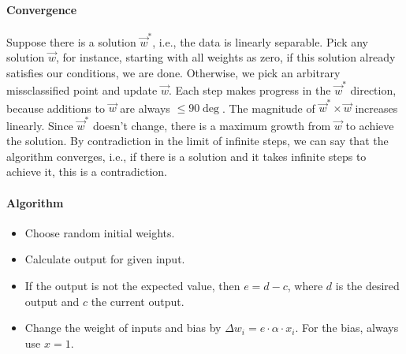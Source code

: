 \documentclass[main]{subfiles}
\begin{document}
\paragraph{Convergence}
Suppose there is a solution $\vec{w}^*$, i.e., the data is linearly separable.
Pick any solution $\vec{w}$, for instance, starting with all weights as zero, if this solution already satisfies our conditions, we are done. Otherwise, we pick an arbitrary missclassified point and update $\vec{w}$. Each step makes progress in the $\vec{w}^*$ direction, because additions to $\vec{w}$ are always $\leq 90\deg$. The magnitude of $\vec{w}^* \times \vec{w}$ increases linearly. Since $\vec{w}^*$ doesn't change, there is a maximum growth from $\vec{w}$ to achieve the solution.
By contradiction in the limit of infinite steps, we can say that the algorithm converges, i.e., if there is a solution and it takes infinite steps to achieve it, this is a contradiction.

\paragraph{Algorithm}
\begin{itemize}[noitemsep,nolistsep]
	\item Choose random initial weights.
	\item Calculate output for given input.
	\item If the output is not the expected value, then $e=d-c$, where $d$ is the desired output and $c$ the current output.
	\item Change the weight of inputs and bias by $\Delta w_i=e\cdot\alpha\cdot x_i$. For the bias, always use $x=1$.
\end{itemize}
\end{document}
